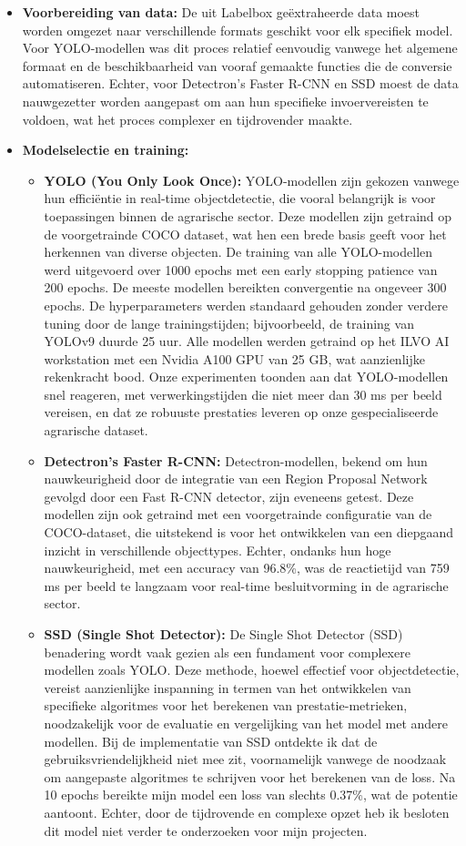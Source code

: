 \begin{itemize}
  \item \textbf{Voorbereiding van data:} De uit Labelbox geëxtraheerde data moest worden omgezet naar verschillende formats geschikt voor elk specifiek model. Voor YOLO-modellen was dit proces relatief eenvoudig vanwege het algemene formaat en de beschikbaarheid van vooraf gemaakte functies die de conversie automatiseren. Echter, voor Detectron's Faster R-CNN en SSD moest de data nauwgezetter worden aangepast om aan hun specifieke invoervereisten te voldoen, wat het proces complexer en tijdrovender maakte.
  \item \textbf{Modelselectie en training:}
  \begin{itemize}
    \item \textbf{YOLO (You Only Look Once):} YOLO-modellen \textcite{Jocher_Ultralytics_YOLO_2023} zijn gekozen vanwege hun efficiëntie in real-time objectdetectie, die vooral belangrijk is voor toepassingen binnen de agrarische sector. Deze modellen zijn getraind op de voorgetrainde COCO dataset, wat hen een brede basis geeft voor het herkennen van diverse objecten. De training van alle YOLO-modellen werd uitgevoerd over 1000 epochs met een early stopping patience van 200 epochs. De meeste modellen bereikten convergentie na ongeveer 300 epochs. De hyperparameters werden standaard gehouden zonder verdere tuning door de lange trainingstijden; bijvoorbeeld, de training van YOLOv9 duurde 25 uur. Alle modellen werden getraind op het ILVO AI workstation met een Nvidia A100 GPU van 25 GB, wat aanzienlijke rekenkracht bood. Onze experimenten toonden aan dat YOLO-modellen snel reageren, met verwerkingstijden die niet meer dan 30 ms per beeld vereisen, en dat ze robuuste prestaties leveren op onze gespecialiseerde agrarische dataset.
    \item \textbf{Detectron's Faster R-CNN:} Detectron-modellen, bekend om hun nauwkeurigheid door de integratie van een Region Proposal Network gevolgd door een Fast R-CNN detector, zijn eveneens getest. Deze modellen zijn ook getraind met een voorgetrainde configuratie van de COCO-dataset, die uitstekend is voor het ontwikkelen van een diepgaand inzicht in verschillende objecttypes. Echter, ondanks hun hoge nauwkeurigheid, met een accuracy van 96.8\%, was de reactietijd van 759 ms per beeld te langzaam voor real-time besluitvorming in de agrarische sector.   
    \item \textbf{SSD (Single Shot Detector):} De Single Shot Detector (SSD) benadering wordt vaak gezien als een fundament voor complexere modellen zoals YOLO. Deze methode, hoewel effectief voor objectdetectie, vereist aanzienlijke inspanning in termen van het ontwikkelen van specifieke algoritmes voor het berekenen van prestatie-metrieken, noodzakelijk voor de evaluatie en vergelijking van het model met andere modellen. Bij de implementatie van SSD ontdekte ik dat de gebruiksvriendelijkheid niet mee zit, voornamelijk vanwege de noodzaak om aangepaste algoritmes te schrijven voor het berekenen van de loss. Na 10 epochs bereikte mijn model een loss van slechts 0.37\%, wat de potentie aantoont. Echter, door de tijdrovende en complexe opzet heb ik besloten dit model niet verder te onderzoeken voor mijn projecten.

\end{itemize}
\end{itemize}
